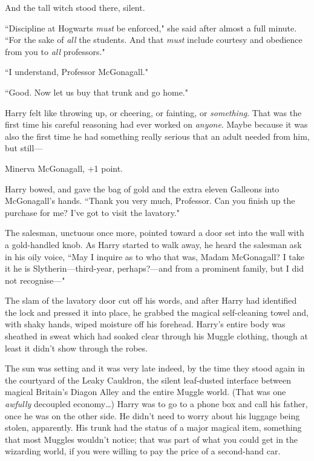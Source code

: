 And the tall witch stood there, silent.

``Discipline at Hogwarts \emph{must} be enforced," she said after almost a full minute. ``For the sake of \emph{all} the students. And that \emph{must} include courtesy and obedience from you to \emph{all} professors."

``I understand, Professor McGonagall."

``Good. Now let us buy that trunk and go home."

Harry felt like throwing up, or cheering, or fainting, or \emph{something}. That was the first time his careful reasoning had ever worked on \emph{anyone}. Maybe because it was also the first time he had something really serious that an adult needed from him, but still—

Minerva McGonagall, +1 point.

Harry bowed, and gave the bag of gold and the extra eleven Galleons into McGonagall's hands. ``Thank you very much, Professor. Can you finish up the purchase for me? I've got to visit the lavatory."

The salesman, unctuous once more, pointed toward a door set into the wall with a gold-handled knob. As Harry started to walk away, he heard the salesman ask in his oily voice, ``May I inquire as to who that was, Madam McGonagall? I take it he is Slytherin—third-year, perhaps?—and from a prominent family, but I did not recognise—"

The slam of the lavatory door cut off his words, and after Harry had identified the lock and pressed it into place, he grabbed the magical self-cleaning towel and, with shaky hands, wiped moisture off his forehead. Harry's entire body was sheathed in sweat which had soaked clear through his Muggle clothing, though at least it didn't show through the robes.

\later

The sun was setting and it was very late indeed, by the time they stood again in the courtyard of the Leaky Cauldron, the silent leaf-dusted interface between magical Britain's Diagon Alley and the entire Muggle world. (That was one \emph{awfully} decoupled economy…) Harry was to go to a phone box and call his father, once he was on the other side. He didn't need to worry about his luggage being stolen, apparently. His trunk had the status of a major magical item, something that most Muggles wouldn't notice; that was part of what you could get in the wizarding world, if you were willing to pay the price of a second-hand car.

